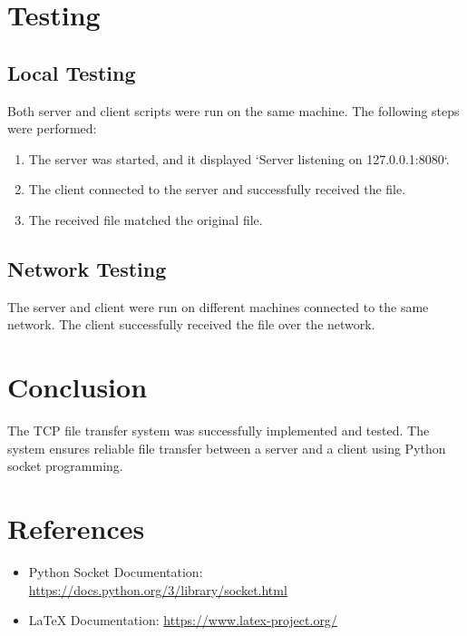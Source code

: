 \documentclass[a4paper,12pt]{article}
\begin{document}
\section*{Testing}
\subsection*{Local Testing}
Both server and client scripts were run on the same machine. The following steps were performed:
\begin{enumerate}
    \item The server was started, and it displayed `Server listening on 127.0.0.1:8080`.
    \item The client connected to the server and successfully received the file.
    \item The received file matched the original file.
\end{enumerate}

\subsection*{Network Testing}
The server and client were run on different machines connected to the same network. The client successfully received the file over the network.

\section*{Conclusion}
The TCP file transfer system was successfully implemented and tested. The system ensures reliable file transfer between a server and a client using Python socket programming.

\section*{References}
\begin{itemize}
    \item Python Socket Documentation: \url{https://docs.python.org/3/library/socket.html}
    \item LaTeX Documentation: \url{https://www.latex-project.org/}
\end{itemize}
\end{document}
